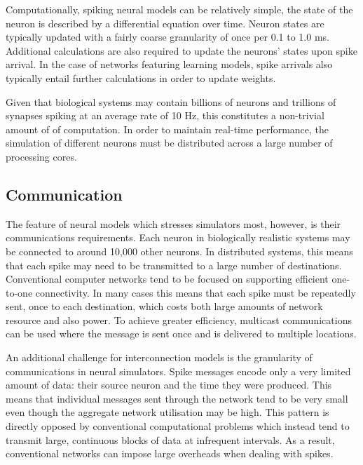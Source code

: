 			Computationally, spiking neural models can be relatively simple, the state
			of the neuron is described by a differential equation over time. Neuron
			states are typically updated with a fairly coarse granularity of once per
			0.1 to 1.0 ms. Additional calculations are also required to update the
			neurons' states upon spike arrival. In the case of networks featuring
			learning models, spike arrivals also typically entail further calculations
			in order to update weights.
			
			Given that biological systems may contain billions of neurons and
			trillions of synapses spiking at an average rate of 10 Hz, this
			constitutes a non-trivial amount of of computation. In order to maintain
			real-time performance, the simulation of different neurons must be
			distributed across a large number of processing cores.
		
		\subsection{Communication}
			
			
			The feature of neural models which stresses simulators most, however, is
			their communications requirements. Each neuron in biologically realistic
			systems may be connected to around 10,000 other neurons. In distributed
			systems, this means that each spike may need to be transmitted to a large
			number of destinations. Conventional computer networks tend to be focused
			on supporting efficient one-to-one connectivity. In many cases this means
			that each spike must be repeatedly sent, once to each destination, which
			costs both large amounts of network resource and also power. To achieve
			greater efficiency, multicast communications can be used where the message
			is sent once and is delivered to multiple locations.
			
			An additional challenge for interconnection models is the granularity of
			communications in neural simulators. Spike messages encode only a very
			limited amount of data: their source neuron and the time they were
			produced. This means that individual messages sent through the network
			tend to be very small even though the aggregate network utilisation may be
			high. This pattern is directly opposed by conventional computational
			problems which instead tend to transmit large, continuous blocks of data
			at infrequent intervals. As a result, conventional networks can impose
			large overheads when dealing with spikes.
			

